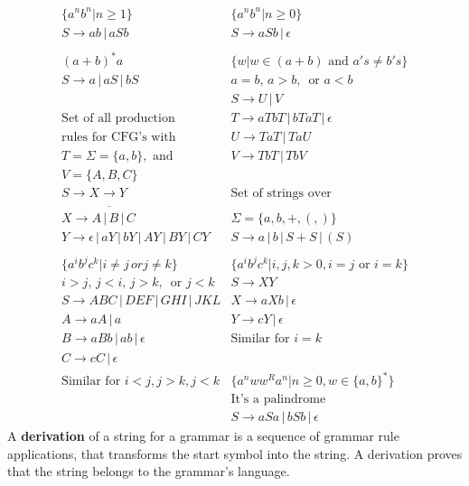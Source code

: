 \documentclass[8pt,letterpaper,twocolumn]{article}
\begin{document}
\begin{eqnarray*}
  \{a^n b^n | n \geq 1\} & \{a^n b^n | n \geq 0\} \\
  S \rightarrow ab \,|\, aSb & S \rightarrow aSb \,|\, \epsilon \\
  \\
  (a+b)^*a & \{w | w \in (a+b) \mbox{ and } a's \neq b's\} \\
  S \rightarrow a \,|\, aS \,|\, bS & a = b,\, a > b,\, \mbox{ or } a < b \\
   & S \rightarrow U \,|\, V \\
  \mbox{Set of all production} & T \rightarrow aTbT \,|\, bTaT \,|\, \epsilon \\
  \mbox{rules for CFG's with} & U \rightarrow TaT \,|\, TaU \\
  T=\Sigma=\{a,b\}, \mbox{ and} & V \rightarrow TbT \,|\, TbV \\ 
  V=\{A,B,C\} &  \\
  S \rightarrow X \underline{\rightarrow} Y & \mbox{Set of strings over} \\
  X \rightarrow A \,|\, B \,|\, C & \Sigma = \{a,b,+,(,)\} \\
  Y \rightarrow \epsilon \,|\, aY \,|\, bY \,|\, AY \,|\, BY \,|\, CY & S \rightarrow a \,|\, b \,|\, S + S \,|\, (S)\\
  \\
  \{a^i b^j c^k | i \neq j \, or j \neq k\} & \{a^i b^j c^k | i,j,k > 0, i=j \mbox{ or } i=k\} \\
  i>j,\, j<i,\, j>k,\, \mbox{ or } j<k &  S \rightarrow XY \\
  S \rightarrow ABC \,|\, DEF \,|\, GHI \,|\, JKL & X \rightarrow aXb \,|\, \epsilon \\
  A \rightarrow aA \,|\, a & Y \rightarrow cY \,|\, \epsilon \\
  B \rightarrow aBb \,|\, ab \,|\, \epsilon & \mbox{Similar for } i=k \\
  C \rightarrow cC \,|\, \epsilon & \\
  \mbox{Similar for } i<j, j>k, j<k & \{a^n w w^R a^n | n \geq 0, w \in \{a,b\}^* \} \\
  & \mbox{It's a palindrome} \\
  & S \rightarrow aSa \,|\, bSb \,|\, \epsilon
\end{eqnarray*}
A \textbf{derivation} of a string for a grammar is a sequence of grammar rule applications,
that transforms the start symbol into the string. A derivation proves that the
string belongs to the grammar's language. \\
\end{document}
